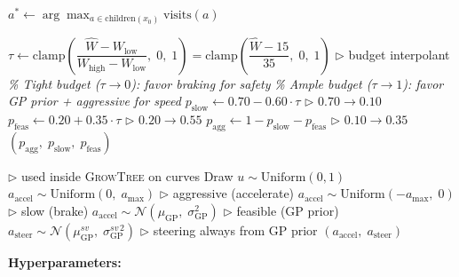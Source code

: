 \documentclass[border=10pt]{standalone}
\begin{document}
\begin{minipage}{0.85\textwidth}
\begin{algorithm}[H]
\begin{algorithmic}[1]
\Statex
\State \Return $a^* \gets \arg\max_{a \in \text{children}(x_0)} \text{visits}(a)$

\Statex
\Statex \hrulefill

\Statex
{}
    \State $\tau \gets \text{clamp}\!\left(\dfrac{\hat{W} - W_{\text{low}}}{W_{\text{high}} - W_{\text{low}}},\; 0,\; 1\right) = \text{clamp}\!\left(\dfrac{\hat{W} - 15}{35},\; 0,\; 1\right)$
    \hfill $\triangleright$ budget interpolant
    \Statex
    \Statex \hspace{2em}\textcolor{commentgreen}{\textit{\% Tight budget ($\tau \!\to\! 0$): favor braking for safety}}
    \Statex \hspace{2em}\textcolor{commentgreen}{\textit{\% Ample budget ($\tau \!\to\! 1$): favor GP prior + aggressive for speed}}
    \Statex
    \State $p_{\text{slow}} \gets 0.70 - 0.60 \cdot \tau$ \hfill $\triangleright$ $0.70 \to 0.10$
    \State $p_{\text{feas}} \gets 0.20 + 0.35 \cdot \tau$ \hfill $\triangleright$ $0.20 \to 0.55$
    \State $p_{\text{agg}} \gets 1 - p_{\text{slow}} - p_{\text{feas}}$ \hfill $\triangleright$ $0.10 \to 0.35$
    \State \Return $(p_{\text{agg}},\; p_{\text{slow}},\; p_{\text{feas}})$
\EndFunction

\Statex
\Statex \hrulefill

\Statex
{} \hfill $\triangleright$ used inside \textsc{GrowTree} on curves
    \State Draw $u \sim \text{Uniform}(0, 1)$
        \State $a_{\text{accel}} \sim \text{Uniform}(0,\; a_{\max})$ \hfill $\triangleright$ aggressive (accelerate)
        \State $a_{\text{accel}} \sim \text{Uniform}(-a_{\max},\; 0)$ \hfill $\triangleright$ slow (brake)
    \Else
        \State $a_{\text{accel}} \sim \mathcal{N}(\mu_{\text{GP}},\; \sigma_{\text{GP}}^2)$ \hfill $\triangleright$ feasible (GP prior)
    \EndIf
    \State $a_{\text{steer}} \sim \mathcal{N}(\mu_{\text{GP}}^{sv},\; \sigma_{\text{GP}}^{sv\,2})$ \hfill $\triangleright$ steering always from GP prior
    \State \Return $(a_{\text{accel}},\; a_{\text{steer}})$
\EndFunction

\end{algorithmic}
\end{algorithm}

\vspace{1.5em}

\noindent\textbf{Hyperparameters:}

\vspace{0.5em}


\end{minipage}
\end{document}
